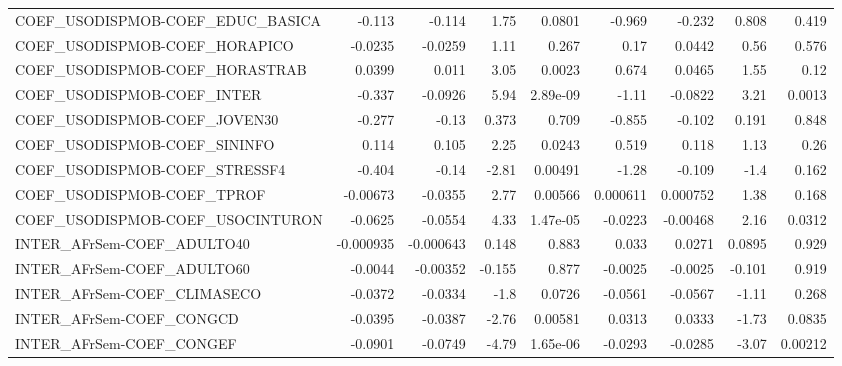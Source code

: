 \begin{tabular}{lrrrrrrrr}
COEF\_USODISPMOB-COEF\_EDUC\_BASICA      &      -0.113 &       -0.114 &    1.75 &   0.0801 &     -0.969 &      -0.232 &        0.808 &         0.419 \\
COEF\_USODISPMOB-COEF\_HORAPICO         &     -0.0235 &      -0.0259 &    1.11 &    0.267 &       0.17 &      0.0442 &         0.56 &         0.576 \\
COEF\_USODISPMOB-COEF\_HORASTRAB        &      0.0399 &        0.011 &    3.05 &   0.0023 &      0.674 &      0.0465 &         1.55 &          0.12 \\
COEF\_USODISPMOB-COEF\_INTER            &      -0.337 &      -0.0926 &    5.94 & 2.89e-09 &      -1.11 &     -0.0822 &         3.21 &        0.0013 \\
COEF\_USODISPMOB-COEF\_JOVEN30          &      -0.277 &        -0.13 &   0.373 &    0.709 &     -0.855 &      -0.102 &        0.191 &         0.848 \\
COEF\_USODISPMOB-COEF\_SININFO          &       0.114 &        0.105 &    2.25 &   0.0243 &      0.519 &       0.118 &         1.13 &          0.26 \\
COEF\_USODISPMOB-COEF\_STRESSF4         &      -0.404 &        -0.14 &   -2.81 &  0.00491 &      -1.28 &      -0.109 &         -1.4 &         0.162 \\
COEF\_USODISPMOB-COEF\_TPROF            &    -0.00673 &      -0.0355 &    2.77 &  0.00566 &   0.000611 &    0.000752 &         1.38 &         0.168 \\
COEF\_USODISPMOB-COEF\_USOCINTURON      &     -0.0625 &      -0.0554 &    4.33 & 1.47e-05 &    -0.0223 &    -0.00468 &         2.16 &        0.0312 \\
INTER\_AFrSem-COEF\_ADULTO40            &   -0.000935 &    -0.000643 &   0.148 &    0.883 &      0.033 &      0.0271 &       0.0895 &         0.929 \\
INTER\_AFrSem-COEF\_ADULTO60            &     -0.0044 &     -0.00352 &  -0.155 &    0.877 &    -0.0025 &     -0.0025 &       -0.101 &         0.919 \\
INTER\_AFrSem-COEF\_CLIMASECO           &     -0.0372 &      -0.0334 &    -1.8 &   0.0726 &    -0.0561 &     -0.0567 &        -1.11 &         0.268 \\
INTER\_AFrSem-COEF\_CONGCD              &     -0.0395 &      -0.0387 &   -2.76 &  0.00581 &     0.0313 &      0.0333 &        -1.73 &        0.0835 \\
INTER\_AFrSem-COEF\_CONGEF              &     -0.0901 &      -0.0749 &   -4.79 & 1.65e-06 &    -0.0293 &     -0.0285 &        -3.07 &       0.00212 \\

\end{tabular}
